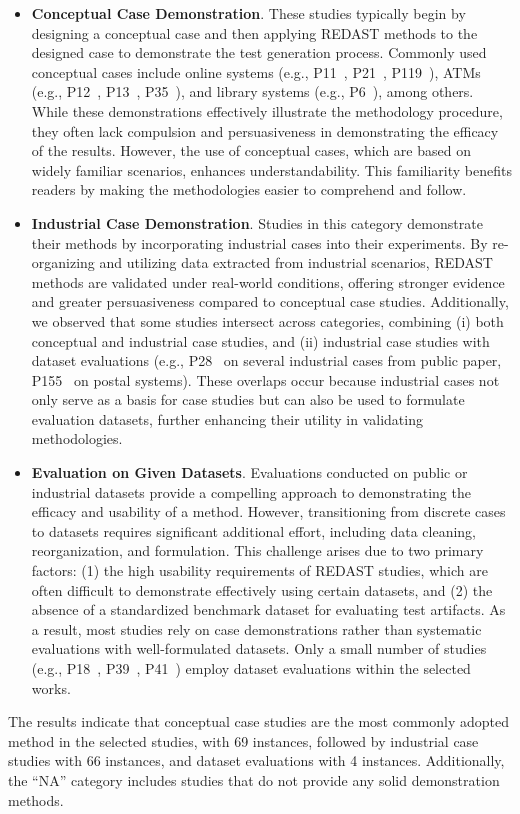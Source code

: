 \begin{itemize}
    \item \textbf{Conceptual Case Demonstration}. These studies typically begin by designing a conceptual case and then applying REDAST methods to the designed case to demonstrate the test generation process. Commonly used conceptual cases include online systems (e.g., P11~, P21~, P119~), ATMs (e.g., P12~, P13~, P35~), and library systems (e.g., P6~), among others. While these demonstrations effectively illustrate the methodology procedure, they often lack compulsion and persuasiveness in demonstrating the efficacy of the results. However, the use of conceptual cases, which are based on widely familiar scenarios, enhances understandability. This familiarity benefits readers by making the methodologies easier to comprehend and follow.
    \item \textbf{Industrial Case Demonstration}. Studies in this category demonstrate their methods by incorporating industrial cases into their experiments. By re-organizing and utilizing data extracted from industrial scenarios, REDAST methods are validated under real-world conditions, offering stronger evidence and greater persuasiveness compared to conceptual case studies. Additionally, we observed that some studies intersect across categories, combining (i) both conceptual and industrial case studies, and (ii) industrial case studies with dataset evaluations (e.g., P28~ on several industrial cases from public paper, P155~ on postal systems). These overlaps occur because industrial cases not only serve as a basis for case studies but can also be used to formulate evaluation datasets, further enhancing their utility in validating methodologies.
    \item \textbf{Evaluation on Given Datasets}. Evaluations conducted on public or industrial datasets provide a compelling approach to demonstrating the efficacy and usability of a method. However, transitioning from discrete cases to datasets requires significant additional effort, including data cleaning, reorganization, and formulation. This challenge arises due to two primary factors: (1) the high usability requirements of REDAST studies, which are often difficult to demonstrate effectively using certain datasets, and (2) the absence of a standardized benchmark dataset for evaluating test artifacts. As a result, most studies rely on case demonstrations rather than systematic evaluations with well-formulated datasets. Only a small number of studies (e.g., P18~, P39~, P41~) employ dataset evaluations within the selected works.
\end{itemize}
The results indicate that conceptual case studies are the most commonly adopted method in the selected studies, with 69 instances, followed by industrial case studies with 66 instances, and dataset evaluations with 4 instances. Additionally, the ``NA'' category includes studies that do not provide any solid demonstration methods.
 
